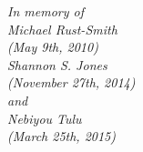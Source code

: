 
\copyrightpage

\begin{abstract}
  
\end{abstract}
%  






\begin{acks}

\end{acks}

\begin{dedication}
	\emph{In memory of\bigskip \\Michael Rust-Smith\\(May 9th, 2010)\bigskip \\Shannon S. Jones\\(November 27th, 2014)\bigskip \\and\\Nebiyou Tulu\\(March 25th, 2015)}
\end{dedication}


